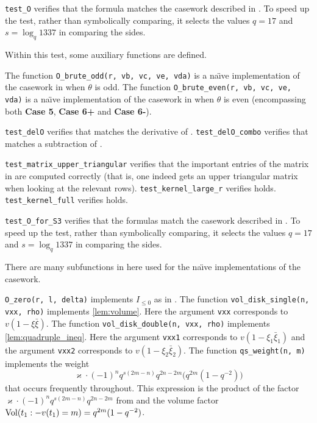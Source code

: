 \begin{enumerate}
  \ii \texttt{test\_O} verifies that the formula 
  matches the casework described in .
  To speed up the test, rather than symbolically comparing,
  it selects the values $q = 17$ and $s = \log_q 1337$ in comparing the sides.

  Within this test, some auxiliary functions are defined.
  \begin{itemize}
    \ii The function \texttt{O\_brute\_odd(r, vb, vc, ve, vda)}
    is a na\"{\i}ve implementation of the casework in  when $\theta$ is odd.
    \ii The function \texttt{O\_brute\_even(r, vb, vc, ve, vda)}
    is a na\"{\i}ve implementation of the casework in  when $\theta$ is even
    (encompassing both \textbf{Case 5}, \textbf{Case 6\ts+} and \textbf{Case 6\ts-}).
  \end{itemize}

  \ii \texttt{test\_delO} verifies that 
  matches the derivative of .
  \ii \texttt{test\_delO\_combo} verifies that 
  matches a subtraction of .

  \ii \texttt{test\_matrix\_upper\_triangular} verifies that the important entries
  of the matrix in  are computed correctly
  (that is, one indeed gets an upper triangular matrix
  when looking at the relevant rows).
  \ii \texttt{test\_kernel\_large\_r} verifies  holds.
  \ii \texttt{test\_kernel\_full} verifies  holds.

  \ii \texttt{test\_O\_for\_S3} verifies that the formulas
  match the casework described in .
  To speed up the test, rather than symbolically comparing,
  it selects the values $q = 17$ and $s = \log_q 1337$ in comparing the sides.

  There are many subfunctions in here used for the
  na\"{\i}ve implementations of the casework.
    \begin{itemize}
      \ii \texttt{O\_zero(r, l, delta)} implements $I_{\le 0}$ as in .
      \ii The function \texttt{vol\_disk\_single(n, vxx, rho)} implements \cref{lem:volume}.
      Here the argument \texttt{vxx} corresponds to $v(1 - \xi \bar \xi)$.
      \ii The function \texttt{vol\_disk\_double(n, vxx, rho)} implements \cref{lem:quadruple_ineq}.
      Here the argument \texttt{vxx1} corresponds to $v(1 - \xi_1 \bar \xi_1)$
      and the argument \texttt{vxx2} corresponds to $v(1 - \xi_2 \bar \xi_2)$.
      \ii The function \texttt{qs\_weight(n, m)} implements the weight
      \[ \varkappa \cdot (-1)^n q^{s(2m-n)} q^{2n-2m} \Big( q^{2m}(1-q^{-2}) \Big) \]
      that occurs frequently throughout.
      This expression is the product of the factor
      $\varkappa \cdot (-1)^n q^{s(2m-n)} q^{2n-2m}$ from 
      and the volume factor $\operatorname{Vol}(t_1: -v(t_1)=m) = q^{2m} (1-q^{-2})$.


\end{itemize}
\end{enumerate}
